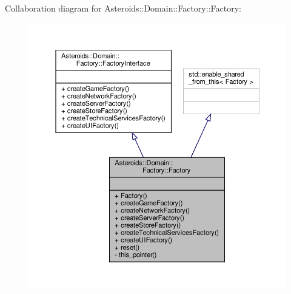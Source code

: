 Collaboration diagram for Asteroids\+:\+:Domain\+:\+:Factory\+:\+:Factory\+:\nopagebreak
\begin{figure}[H]
\begin{center}
\leavevmode
\includegraphics[width=350pt]{classAsteroids_1_1Domain_1_1Factory_1_1Factory__coll__graph}
\end{center}
\end{figure}
